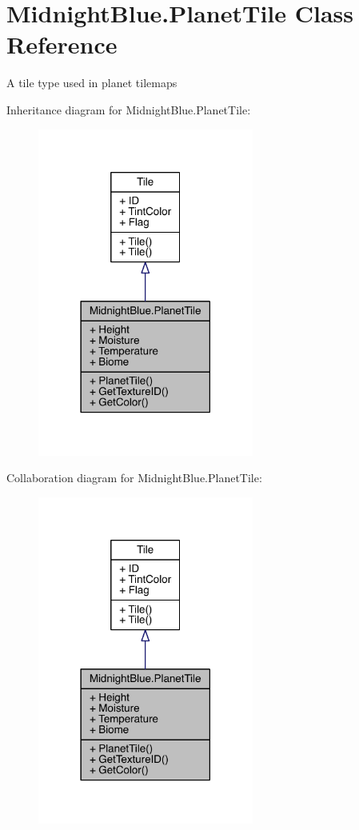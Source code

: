\hypertarget{class_midnight_blue_1_1_planet_tile}{}\section{Midnight\+Blue.\+Planet\+Tile Class Reference}
\label{class_midnight_blue_1_1_planet_tile}


A tile type used in planet tilemaps  




Inheritance diagram for Midnight\+Blue.\+Planet\+Tile\+:
\nopagebreak
\begin{figure}[H]
\begin{center}
\leavevmode
\includegraphics[width=201pt]{class_midnight_blue_1_1_planet_tile__inherit__graph}
\end{center}
\end{figure}


Collaboration diagram for Midnight\+Blue.\+Planet\+Tile\+:
\nopagebreak
\begin{figure}[H]
\begin{center}
\leavevmode
\includegraphics[width=201pt]{class_midnight_blue_1_1_planet_tile__coll__graph}
\end{center}
\end{figure}
